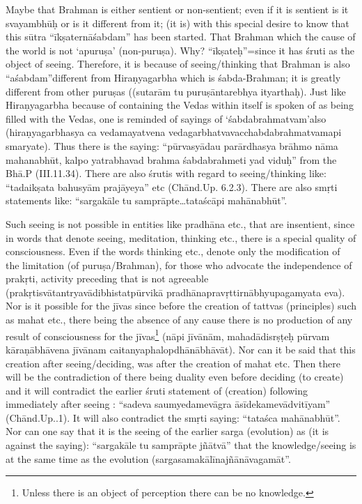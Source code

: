 Maybe that Brahman is either sentient or non-sentient; even if it is sentient is it svayambhūḥ or is it different from it; (it is) with this special desire to know that this sūtra “īkṣaternāśabdam” has been started. That Brahman which the cause of the world is not ‘apuruṣa’ (non-puruṣa). Why? “īkṣateḥ”=since it has śruti as the object of seeing. Therefore, it is because of seeing/thinking  that Brahman is also “aśabdam”different from Hiraṇyagarbha which is śabda-Brahman; it is greatly different from other puruṣas ((sutarām tu puruṣāntarebhya ityarthaḥ). Just like Hiraṇyagarbha because of containing the Vedas within itself is spoken of as being filled with the Vedas, one is reminded of sayings of ‘śabdabrahmatvam’also (hiraṇyagarbhasya ca vedamayatvena vedagarbhatvavacchabdabrahmatvamapi smaryate). Thus there is the saying: “pūrvasyādau parārdhasya brāhmo nāma mahanabhūt, kalpo yatrabhavad brahma śabdabrahmeti yad viduḥ” from the Bhā.P (III.11.34). There are also śrutis with regard to seeing/thinking like: “tadaikṣata bahusyām prajāyeya” etc (Chānd.Up. 6.2.3). There are also smṛti statements like: “sargakāle tu samprāpte…tataścāpi mahānabhūt”. 

Such seeing is not possible in entities like pradhāna etc., that are insentient, since in words that denote seeing, meditation, thinking etc., there is a special quality of consciousness. Even if the words thinking etc., denote only the modification of the limitation (of puruṣa/Brah\-man), for those who advocate the independence of prakṛti, activity preceding that is not agreeable (prakṛtisvātantryavādibhistatpūrvikā pradhānapravṛttirnābhyupagamyata eva). Nor is it possible for the jīvas since before the creation of tattvas (principles) such as mahat etc., there being the absence of any cause there is no production of any result of consciousness for the jīvas\footnote{Unless there is an object of perception there can be no knowledge.} (nāpi jīvānām, mahadādisrṣṭeḥ pūrvam kāraṇābhāvena jīvānam caitanyaphalopdhānābhāvāt). Nor can it be said that this creation after seeing/deciding, was after the creation of mahat etc. Then there will be the contradiction of there being duality even before deciding (to create) and it will contradict the earlier śruti statement of (creation) following immediately after seeing : “sadeva saumyedamevāgra āsīdekamevādvitīyam” (Chānd.Up..1). It will also contradict the smṛti saying: “tataśca mahānabhūt”. Nor can one say that it is the seeing of the earlier sarga (evolution) as (it is against the saying): “sargakāle tu samprāpte jñātvā” that the knowledge/seeing is at the same time as the evolution (sargasamakālīnajñānāvagamāt”.

